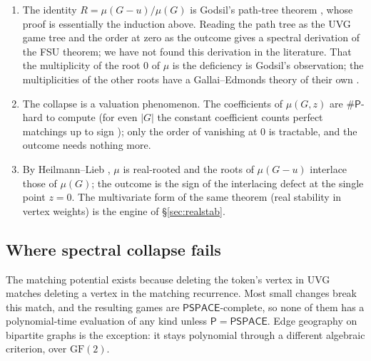 \documentclass[final]{siamart0516}
\numberwithin{theorem}{section}
\numberwithin{equation}{section}
\theoremstyle{siamnonum}
\renewenvironment{remark*}{\remarkstar}{\endremarkstar}
\theoremstyle{plain}
\newcommand{\cls}[1]{\mathsf{#1}}
\newcommand{\PSPACE}{\cls{PSPACE}}
\newcommand{\Pclass}{\cls{P}}
\newcommand{\sharpP}{\#\cls{P}}
\begin{document}
\begin{remark*}
\begin{enumerate}[label=(\arabic*)]
\item The identity $R=\mu(G-u)/\mu(G)$ is Godsil's path-tree theorem \cite{Godsil81,GodsilBook}, whose proof is essentially the induction above. Reading the path tree as the UVG game tree and the order at zero as the outcome gives a spectral derivation of the FSU theorem; we have not found this derivation in the literature. That the multiplicity of the root $0$ of $\mu$ is the deficiency is Godsil's observation; the multiplicities of the other roots have a Gallai--Edmonds theory of their own \cite{Godsil95,KuChen}.
\item The collapse is a valuation phenomenon. The coefficients of $\mu(G,z)$ are $\sharpP$-hard to compute (for even $|G|$ the constant coefficient counts perfect matchings up to sign \cite{Valiant}); only the order of vanishing at $0$ is tractable, and the outcome needs nothing more.
\item By Heilmann--Lieb \cite{HeilmannLieb}, $\mu$ is real-rooted and the roots of $\mu(G-u)$ interlace those of $\mu(G)$; the outcome is the sign of the interlacing defect at the single point $z=0$. The multivariate form of the same theorem (real stability in vertex weights) is the engine of \S\ref{sec:realstab}.
\end{enumerate}
\end{remark*}

\subsection{Where spectral collapse fails}\label{ssec:fails}
The matching potential exists because deleting the token's vertex in UVG matches deleting a vertex in the matching recurrence. Most small changes break this match, and the resulting games are $\PSPACE$-complete, so none of them has a polynomial-time evaluation of any kind unless $\Pclass=\PSPACE$. Edge geography on bipartite graphs is the exception: it stays polynomial through a different algebraic criterion, over $\mathrm{GF}(2)$.
\end{document}
